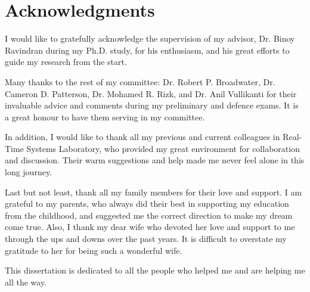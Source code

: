 \chapter*{\label{acknowledgments}Acknowledgments}


I would like to gratefully acknowledge the supervision of my advisor, Dr. Binoy Ravindran
during my Ph.D. study, for his enthusiasm, and his great efforts to guide my research from the start.

Many thanks to the rest of my committee: Dr. Robert P. Broadwater, Dr. Cameron D. Patterson, Dr. Mohamed R. Rizk, and Dr. Anil Vullikanti for their invaluable advice and comments during my preliminary and defence exams. It is a great honour to have them serving in my committee.


In addition, I would like to thank all my previous and current colleagues in Real-Time Systems Laboratory, who provided my great environment for collaboration and discussion. Their warm suggestions and help made me never feel alone in this long journey.


Last but not least, thank all my family members for their love and support. I am grateful to
my parents, who always did their best in supporting my education from the childhood, and suggested me the correct direction to make my dream come true. Also, I thank my dear wife who devoted her love and support to me through the ups and downs over the past years. It is difficult to overstate my gratitude to her for being such a wonderful wife.


This dissertation is dedicated to all the people who helped me and are helping me all the
way.